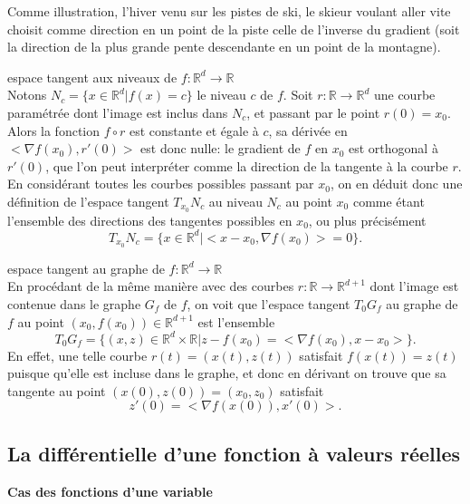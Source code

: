 \documentclass[class=report,crop=false]{standalone}
\begin{document}
{{Comme illustration, l'hiver venu sur les pistes de ski, le skieur voulant aller vite choisit comme direction en un point de la piste celle de l'inverse du gradient (soit la direction de la plus grande pente descendante en un point de la montagne).

 espace tangent aux niveaux de $f:\mathbb R^d \to \mathbb R$\\
Notons $N_c=\{x\in \mathbb R^d| f(x)=c\}$ le niveau $c$ de $f$. Soit $r:\mathbb R \to \mathbb R^d$ une courbe paramétrée dont l'image est inclus dans $N_c$, et passant par le point $r(0)=x_0$. Alors la fonction $f\circ r$ est constante et égale \`a $c$, sa dérivée en  $<\nabla f(x_0),r'(0)>$ est donc nulle: le gradient de $f$ en $x_0$ est orthogonal \`a $r'(0)$, que l'on peut interpréter comme la direction de la tangente \`a la courbe $r$. En considérant toutes les courbes possibles passant par $x_0$, on en déduit donc une définition de l'espace tangent $T_{x_0}N_c$ au niveau $N_c$ au point $x_0$ comme étant l'ensemble des directions des tangentes possibles en $x_0$, ou plus précisément 
$$T_{x_0}N_c=\{x\in \mathbb R^d| <x-x_0, \nabla f(x_0)>=0\}.$$


 espace tangent au graphe de $f:\mathbb R^d \to \mathbb R$\\
En procédant de la m\^eme mani\`ere avec des courbes $r:\mathbb R \to \mathbb R^{d+1}$ dont l'image est contenue dans le graphe $G_f$ de $f$, on voit que l'espace tangent $T_0G_f$ au graphe de $f$ au point $(x_0,f(x_0))\in \mathbb R^{d+1}$ est l'ensemble
$$T_0G_f=\{(x,z)\in \mathbb R^d\times \mathbb R |z-f(x_0)=<\nabla f(x_0),x-x_0>\}.$$
En effet, une telle courbe $r(t)=(x(t),z(t))$ satisfait $f(x(t))=z(t)$ puisque qu'elle est incluse dans le graphe, et donc en dérivant on trouve que sa tangente au point $(x(0),z(0))=(x_0,z_0)$ satisfait
$$z'(0)=<\nabla f (x(0)), x'(0)>.$$


\subsection{La différentielle d'une fonction \`a valeurs réelles}


{\bf Cas des fonctions d'une variable}


}}
\end{document}
